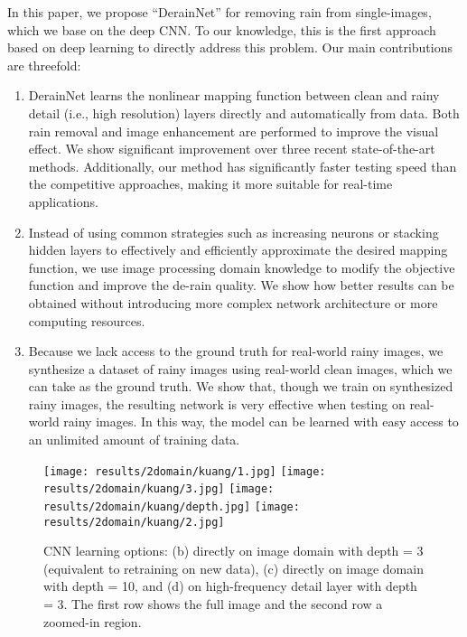 \documentclass[journal]{IEEEtran}
\begin{document}
In this paper, we propose ``DerainNet'' for removing rain from single-images, which we base on the deep CNN. To our knowledge, this is the first approach based on deep learning to directly address this problem. Our main contributions are threefold:
\begin{enumerate}
 \item DerainNet learns the nonlinear mapping function between clean and rainy detail (i.e., high resolution) layers directly and automatically from data. Both rain removal and image enhancement are performed to improve the visual effect. We show significant improvement over three recent state-of-the-art methods. Additionally, our method has significantly faster testing speed than the competitive approaches, making it more suitable for real-time applications.
 \item  Instead of using common strategies such as increasing neurons or stacking hidden layers to effectively and efficiently approximate the desired mapping function, we use image processing domain knowledge to modify the objective function and improve the de-rain quality. We show how better results can be obtained without introducing more complex network architecture or more computing resources.
\item  Because we lack access to the ground truth for real-world rainy images, we synthesize a dataset of rainy images using real-world clean images, which we can take as the ground truth. We show that, though we train on synthesized rainy images, the resulting network is very effective when testing on real-world rainy images. In this way, the model can be learned with easy access to an unlimited amount of training data.
\end{enumerate}

\begin{figure*}[th!]
\centering
\texttt{[image: results/2domain/kuang/1.jpg]}
\texttt{[image: results/2domain/kuang/3.jpg]}
\texttt{[image: results/2domain/kuang/depth.jpg]}
\texttt{[image: results/2domain/kuang/2.jpg]}\\
\caption{CNN learning options: (b) directly on image domain with depth = 3 (equivalent to retraining \cite{15} on new data), (c) directly on image domain with depth = 10, and (d) on high-frequency detail layer with depth = 3. The first row shows the full image and the second row a zoomed-in region.} \label{fig.domain}
\end{figure*}
\end{document}
